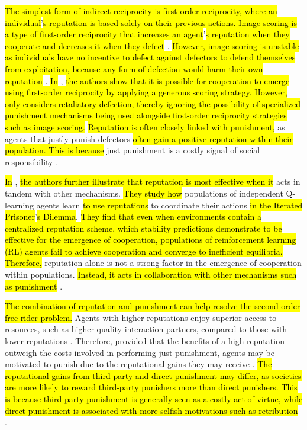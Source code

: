 \documentclass[sn-aps,numbered]{sn-jnl}%
\theoremstyle{thmstyleone}%
\theoremstyle{thmstyletwo}%
\theoremstyle{thmstylethree}%
\begin{document}
\hl{The simplest form of indirect reciprocity is first-order reciprocity, where an individual}’\hl{s reputation is based solely on their previous actions. Image scoring is a type of first-order reciprocity that increases an agent}’\hl{s reputation when they cooperate and decreases it when they defect} \citep{image_scoring}. \hl{However, image scoring is unstable as individuals have no incentive to defect against defectors to defend themselves from exploitation, because any form of defection would harm their own reputation} \citep{schmid2021unified}. \hl{In} \citep{schmid2021unified}, \hl{the authors show that it is possible for cooperation to emerge using first-order reciprocity by applying a generous scoring strategy. However,} \citep{schmid2021unified} \hl{only considers retaliatory defection, thereby ignoring the possibility of specialized punishment mechanisms being used alongside first-order reciprocity strategies such as image scoring.} \hl{Reputation is often closely linked with punishment,} as agents that justly punish defectors \hl{often gain a positive reputation within their population. This is because} just punishment is a costly signal of social responsibility \citep{Jordan2016ThirdpartyPA, Dreber2008}.

\hl{In} \citep{coop_reputation_mirco}, \hl{the authors further illustrate that reputation is most effective when it} acts in tandem with other mechanisms. \hl{They study how} populations of independent Q-learning agents learn \hl{to use reputations} to coordinate their actions \hl{in the Iterated Prisoner}’\hl{s Dilemma}. \hl{They find that even when environments contain a centralized reputation scheme, which stability predictions demonstrate to be effective for the emergence of cooperation, populations of reinforcement learning (RL) agents fail to achieve cooperation and converge to inefficient equilibria. Therefore,} reputation alone is not a strong factor in the emergence of cooperation within populations. \hl{Instead, it acts in collaboration with other mechanisms such as punishment} \citep{Rand2011, eccles2019learningreciprocity, boyd1992punishment, Feng_partnerchoice, Redhead2021}.

\hl{The combination of reputation and punishment can help resolve the second-order free rider problem.} Agents with higher reputations enjoy superior access to resources, such as higher quality interaction partners, compared to those with lower reputations \citep{Roberts2021, networks_reliable_rep_coop_review, Gross2019, language_of_coop}. Therefore, provided that the benefits of a high reputation outweigh the costs involved in performing just punishment, agents may be motivated to punish due to the reputational gains they may receive \citep{Redhead2021}. \hl{The reputational gains from third-party and direct punishment may differ, as societies are more likely to reward third-party punishers more than direct punishers. This is because third-party punishment is generally seen as a costly act of virtue, while direct punishment is associated with more selfish motivations such as retribution} \citep{Raihani2015_tpp_rewarded_helpers, Chen2020, Redhead2021}.
\end{document}
